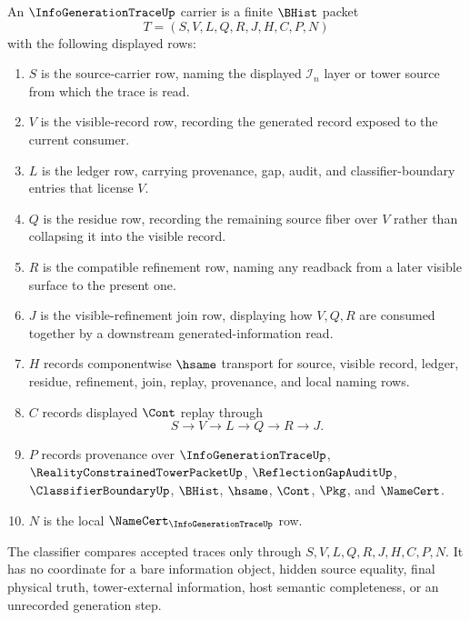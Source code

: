 \begin{definition}
\label{def:info-generation-trace-carrier}
An $\InfoGenerationTraceUp$ carrier is a finite $\BHist$ packet
$$
T=(S,V,L,Q,R,J,H,C,P,N)
$$
with the following displayed rows:
\begin{enumerate}
\item $S$ is the source-carrier row, naming the displayed $\mathcal I_n$ layer or tower source from which the trace is read.
\item $V$ is the visible-record row, recording the generated record exposed to the current consumer.
\item $L$ is the ledger row, carrying provenance, gap, audit, and classifier-boundary entries that license $V$.
\item $Q$ is the residue row, recording the remaining source fiber over $V$ rather than collapsing it into the visible record.
\item $R$ is the compatible refinement row, naming any readback from a later visible surface to the present one.
\item $J$ is the visible-refinement join row, displaying how $V,Q,R$ are consumed together by a downstream generated-information read.
\item $H$ records componentwise $\hsame$ transport for source, visible record, ledger, residue, refinement, join, replay, provenance, and local naming rows.
\item $C$ records displayed $\Cont$ replay through
$$
S\longrightarrow V\longrightarrow L\longrightarrow Q\longrightarrow R\longrightarrow J .
$$
\item $P$ records provenance over $\InfoGenerationTraceUp$, $\RealityConstrainedTowerPacketUp$, $\ReflectionGapAuditUp$, $\ClassifierBoundaryUp$, $\BHist$, $\hsame$, $\Cont$, $\Pkg$, and $\NameCert$.
\item $N$ is the local $\NameCert_{\InfoGenerationTraceUp}$ row.
\end{enumerate}
The classifier compares accepted traces only through $S,V,L,Q,R,J,H,C,P,N$. It has no coordinate for a bare information object, hidden source equality, final physical truth, tower-external information, host semantic completeness, or an unrecorded generation step.
\end{definition}

